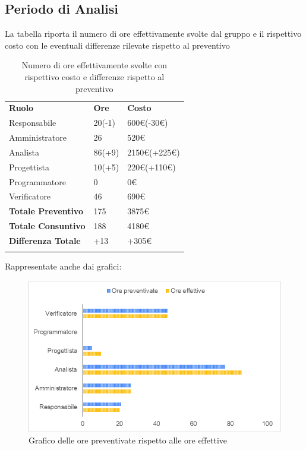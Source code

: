 	\subsection{Periodo di Analisi}
	La tabella riporta il numero di ore effettivamente svolte dal gruppo e il rispettivo costo con le eventuali differenze rilevate rispetto al preventivo
	\begin{longtable} {							
			>{}p{40mm}  
			>{}p{20mm}	
			>{}p{28mm}			
		}			
		\rowcolor{gray!50}
		
		\textbf{Ruolo} & \textbf{Ore} & \textbf{Costo} \TBstrut \\
		Responsabile & 20(-1) & 600\euro{}(-30\euro{}) \TBstrut \\
		Amministratore & 26 & 520\euro{} \TBstrut \\
		Analista & 86(+9)& 2150\euro{}(+225\euro{}) \TBstrut \\
		Progettista & 10(+5) & 220\euro{}(+110\euro{}) \TBstrut \\
		Programmatore & 0 & 0\euro{} \TBstrut \\
		Verificatore & 46 & 690\euro{} \TBstrut \\
		\textbf{Totale Preventivo} & 175 & 3875\euro{}	\TBstrut \\	
		\textbf{Totale Consuntivo} & 188 & 4180\euro{}	\TBstrut \\	
		\textbf{Differenza Totale} & +13 & +305\euro{} \TBstrut \\
		\rowcolor{white}
		\caption{Numero di ore effettivamente svolte con rispettivo costo e differenze rispetto al preventivo}	
	\end{longtable}
	\pagebreak
	Rappresentate anche dai grafici:
	\begin{figure} [H]
		\includegraphics[width=\linewidth]{./img/Grafici/13.png}
		\caption{Grafico delle ore preventivate rispetto alle ore effettive}
	\end{figure}

